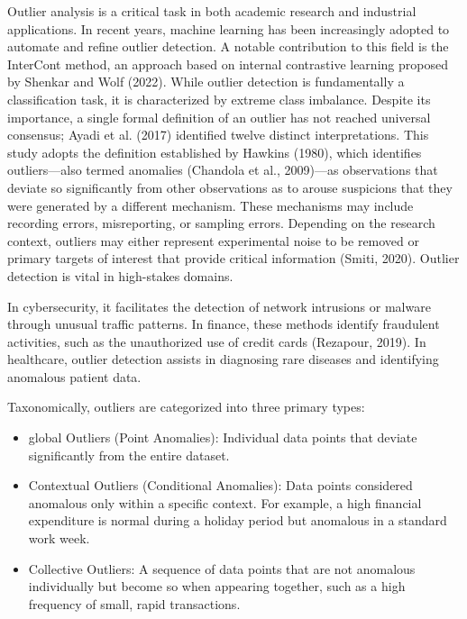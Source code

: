 Outlier analysis is a critical task in both academic research and industrial applications. 
In recent years, machine learning has been increasingly adopted to automate and refine outlier detection. 
A notable contribution to this field is the InterCont method, an approach based on internal contrastive learning proposed by Shenkar and Wolf (2022). 
While outlier detection is fundamentally a classification task, it is characterized by extreme class imbalance.
Despite its importance, a single formal definition of an outlier has not reached universal consensus; Ayadi et al. (2017) identified twelve distinct interpretations. 
This study adopts the definition established by Hawkins (1980), which identifies outliers—also termed anomalies (Chandola et al., 2009)—as observations that deviate so significantly from other observations as to arouse suspicions that they were generated by a different mechanism. 
These mechanisms may include recording errors, misreporting, or sampling errors. Depending on the research context, outliers may either represent experimental noise to be removed or primary targets of interest that provide critical information (Smiti, 2020).
Outlier detection is vital in high-stakes domains. 


In cybersecurity, it facilitates the detection of network intrusions or malware through unusual traffic patterns. 
In finance, these methods identify fraudulent activities, such as the unauthorized use of credit cards (Rezapour, 2019). 
In healthcare, outlier detection assists in diagnosing rare diseases and identifying anomalous patient data.


Taxonomically, outliers are categorized into three primary types:


\begin{itemize}
    \item   global Outliers (Point Anomalies): Individual data points that deviate significantly from the entire dataset.
    \item   Contextual Outliers (Conditional Anomalies): Data points considered anomalous only within a specific context. 
            For example, a high financial expenditure is normal during a holiday period but anomalous in a standard work week.
    \item   Collective Outliers: A sequence of data points that are not anomalous individually but become so when appearing together, such as a high frequency of small, rapid transactions.
\end{itemize}           

